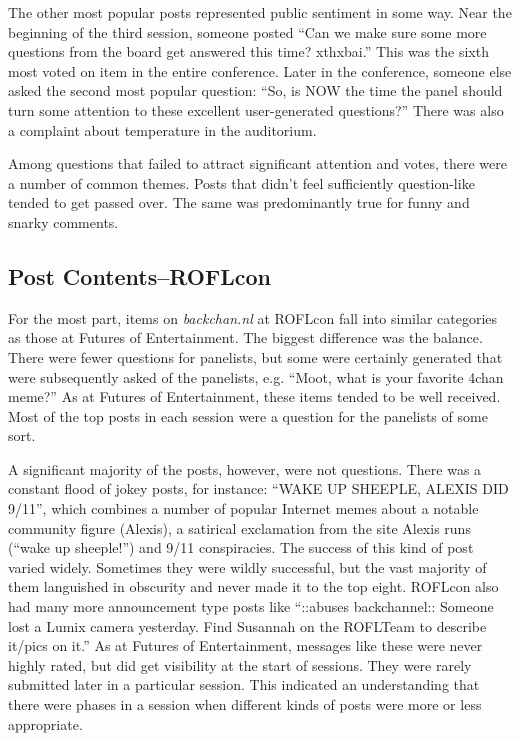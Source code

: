 The other most popular posts represented public sentiment in some way. Near the beginning of the third session, someone posted ``Can we make sure some more questions from the board get answered this time? xthxbai.'' This was the sixth most voted on item in the entire conference. Later in the conference, someone else asked the second most popular question: ``So, is NOW the time the panel should turn some attention to these excellent user-generated questions?'' There was also a complaint about temperature in the auditorium.

Among questions that failed to attract significant attention and votes, there were a number of common themes. Posts that didn't feel sufficiently question-like tended to get passed over. The same was predominantly true for funny and snarky comments. 

\subsection{Post Contents--ROFLcon}
For the most part, items on \emph{backchan.nl} at ROFLcon fall into similar categories as those at Futures of Entertainment. The biggest difference was the balance. There were fewer questions for panelists, but some were certainly generated that were subsequently asked of the panelists, e.g. ``Moot, what is your favorite 4chan meme?'' As at Futures of Entertainment, these items tended to be well received. Most of the top posts in each session were a question for the panelists of some sort.

A significant majority of the posts, however, were not questions. There was a constant flood of jokey posts, for instance: ``WAKE UP SHEEPLE, ALEXIS DID 9/11'', which combines a number of popular Internet memes about a notable community figure (Alexis), a satirical exclamation from the site Alexis runs (``wake up sheeple!'') and 9/11 conspiracies. The success of this kind of post varied widely. Sometimes they were wildly successful, but the vast majority of them languished in obscurity and never made it to the top eight. ROFLcon also had many more announcement type posts like ``::abuses backchannel:: Someone lost a Lumix camera yesterday. Find Susannah on the ROFLTeam to describe it/pics on it.'' As at Futures of Entertainment, messages like these were never highly rated, but did get visibility at the start of sessions. They were rarely submitted later in a particular session. This indicated an understanding that there were phases in a session when different kinds of posts were more or less appropriate. 

